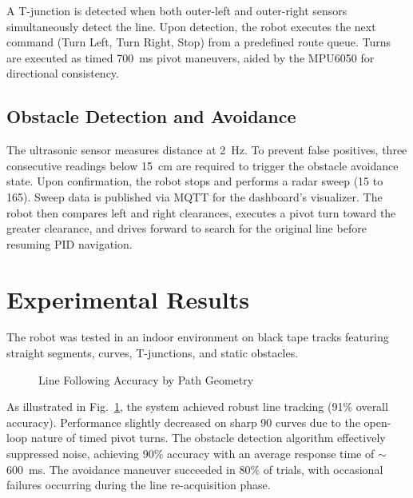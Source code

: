 \documentclass[conference]{IEEEtran}
\begin{document}
A T-junction is detected when both outer-left and outer-right sensors simultaneously detect the line. Upon detection, the robot executes the next command (Turn Left, Turn Right, Stop) from a predefined route queue. Turns are executed as timed 700~ms pivot maneuvers, aided by the MPU6050 for directional consistency.

\subsection{Obstacle Detection and Avoidance}
The ultrasonic sensor measures distance at 2~Hz. To prevent false positives, three consecutive readings below 15~cm are required to trigger the obstacle avoidance state. Upon confirmation, the robot stops and performs a radar sweep (15\textdegree{} to 165\textdegree{}). Sweep data is published via MQTT for the dashboard's visualizer. The robot then compares left and right clearances, executes a pivot turn toward the greater clearance, and drives forward to search for the original line before resuming PID navigation.

\section{Experimental Results}

The robot was tested in an indoor environment on black tape tracks featuring straight segments, curves, T-junctions, and static obstacles. 

\begin{figure}[ht]
\centering
{}
\caption{Line Following Accuracy by Path Geometry}
\label{fig:accuracy}
\end{figure}

As illustrated in Fig.~\ref{fig:accuracy}, the system achieved robust line tracking (91\% overall accuracy). Performance slightly decreased on sharp 90\textdegree{} curves due to the open-loop nature of timed pivot turns. The obstacle detection algorithm effectively suppressed noise, achieving 90\% accuracy with an average response time of $\sim$600~ms. The avoidance maneuver succeeded in 80\% of trials, with occasional failures occurring during the line re-acquisition phase.
\end{document}
